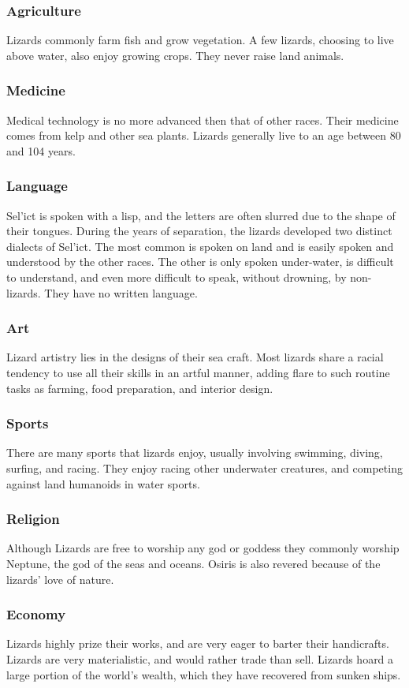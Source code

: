 \begin{multicols*}{2}
\subsubsection{Agriculture}
Lizards commonly farm fish and grow vegetation. A few lizards, choosing to live above water, also enjoy growing crops. They never raise land animals.
\subsubsection{Medicine}
Medical technology is no more advanced then that of other races. Their medicine comes from kelp and other sea plants. Lizards generally live to an age between 80 and 104 years.
\subsubsection{Language}
Sel'ict is spoken with a lisp, and the letters are often slurred due to the shape of their tongues. During the years of separation, the lizards developed two distinct dialects of Sel'ict. The most common is spoken on land and is easily spoken and understood by the other races. The other is only spoken under-water, is difficult to understand, and even more difficult to speak, without drowning, by non-lizards. They have no written language.
\subsubsection{Art}
Lizard artistry lies in the designs of their sea craft. Most lizards share a racial tendency to use all their skills in an artful manner, adding flare to such routine tasks as farming, food preparation, and interior design.
\subsubsection{Sports}
There are many sports that lizards enjoy, usually involving swimming, diving, surfing, and racing. They enjoy racing other underwater creatures, and competing against land humanoids in water sports.
\subsubsection{Religion}
Although Lizards are free to worship any god or goddess they commonly worship Neptune, the god of the seas and oceans. Osiris is also revered because of the lizards' love of nature.
\subsubsection{Economy}
Lizards highly prize their works, and are very eager to barter their handicrafts. Lizards are very materialistic, and would rather trade than sell. Lizards hoard a large portion of the world's wealth, which they have recovered from sunken ships.

\end{multicols*}
